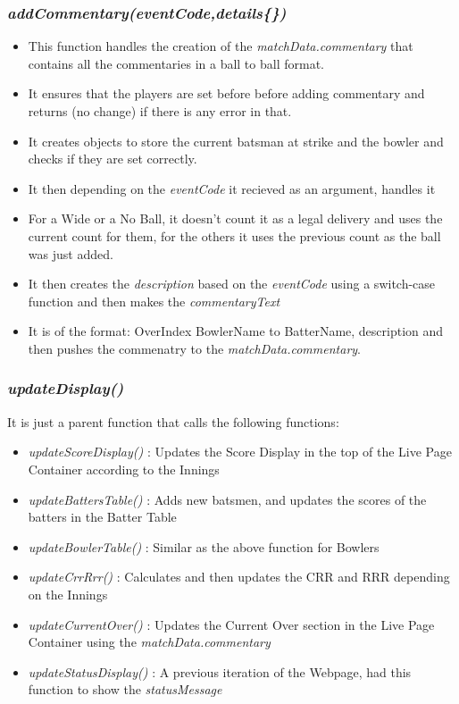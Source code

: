 \documentclass[a4paper,12pt]{article}
\begin{document}
\subsubsection{\textit{addCommentary(eventCode,details\{\})}}
\begin{itemize}
\item This function handles the creation of the \textit{matchData.commentary} that contains all the commentaries in a ball to ball format.
\item It ensures that the players are set before before adding commentary and returns (no change) if there is any error in that.
\item It creates objects to store the current batsman at strike and the bowler and checks if they are set correctly.
\item It then depending on the \textit{eventCode} it recieved as an argument, handles it
\item For a Wide or a No Ball, it doesn't count it as a legal delivery and uses the current count for them, for the others it uses the previous count as the ball was just added.
\item It then creates the \textit{description} based on the \textit{eventCode} using a switch-case function and then makes the \textit{commentaryText}
\item It is of the format: OverIndex BowlerName to BatterName, description and then pushes the commenatry to the \textit{matchData.commentary}.
\end{itemize}

\subsubsection{\textit{updateDisplay()}}
It is just a parent function that calls the following functions:
\begin{itemize}
\item \textit{updateScoreDisplay()} : Updates the Score Display in the top of the Live Page \hspace*{4.3cm} Container according to the Innings
\item \textit{updateBattersTable()} : Adds new batsmen, and updates the scores of the batters \hspace*{4.2cm} in the Batter Table
\item \textit{updateBowlerTable()} : Similar as the above function for Bowlers 
\item \textit{updateCrrRrr()} : Calculates and then updates the CRR and RRR depending on \hspace*{3.3cm} the Innings
\item \textit{updateCurrentOver()} : Updates the Current Over section in the Live Page \\ \hspace*{4.1cm} Container using the \textit{matchData.commentary}
\item \textit{updateStatusDisplay()} : A previous iteration of the Webpage, had this function to \hspace*{4.5cm} show the \textit{statusMessage} 
\end{itemize}
\end{document}
